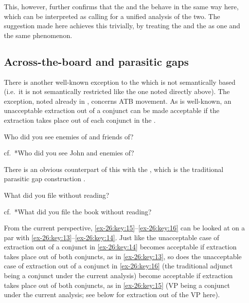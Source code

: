 \documentclass[output=paper]{langsci/langscibook}
\begin{document}
This, however, further confirms that the  and the  behave in
the same way here, which can be interpreted as calling for a unified analysis
of the two. The suggestion made here achieves this trivially, by treating the
 and the  as one and the same phenomenon.

\subsection{Across-the-board  and parasitic gaps}

There is another well-known exception to the  which is not
semantically based (i.e.\ it is not semantically restricted like the one noted
directly above). The exception, noted already in \citet{Ross1967}, concerns
\gls{ATB} movement. As is well-known, an
unacceptable extraction out of a conjunct can be made acceptable if the
extraction takes place out of each conjunct in the
.

\ea\label{ex-26:key:13} Who did you see enemies of and friends of?
\z

\ea\label{ex-26:key:14} cf.\ *Who did you see John and enemies of?
\z

There is an obvious counterpart of this with the , which is the traditional
parasitic gap construction \parencite[see
also][]{Haik1985,HuyvanRiem1985,Williams1990,Franks1993,Progovac1998,Nunes2004}.

\ea\label{ex-26:key:15} What did you file without reading?
\z

\ea\label{ex-26:key:16} cf.\ *What did you file the book without reading?
\z

From the current perspective, \eqref{ex-26:key:15}--\eqref{ex-26:key:16} can be looked at on a par with
\eqref{ex-26:key:13}--\eqref{ex-26:key:14}. Just like the unacceptable case of extraction out of a conjunct in
\eqref{ex-26:key:14} becomes acceptable if extraction takes place out of both conjuncts, as in
\eqref{ex-26:key:13}, so does the unacceptable case of extraction out of a conjunct in \eqref{ex-26:key:16}
(the traditional adjunct being a conjunct under the current analysis) become
acceptable if extraction takes place out of both conjuncts, as in \eqref{ex-26:key:15} (VP
being a conjunct under the current analysis; see below for extraction out of
the VP here).
\end{document}

